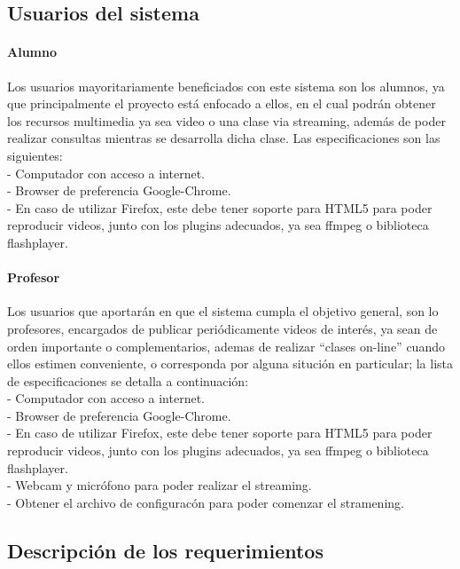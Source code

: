\documentclass[12pt]{article}
\begin{document}
\subsection{Usuarios del sistema}
\paragraph{Alumno\\}

Los usuarios mayoritariamente beneficiados con este sistema son los alumnos, ya que principalmente
el proyecto está enfocado a ellos, en el cual podrán obtener los recursos multimedia ya sea video
o una clase via streaming, además de poder realizar consultas mientras se desarrolla dicha clase. Las 
especificaciones son las siguientes:\\
- Computador con acceso a internet.\\
- Browser de preferencia Google-Chrome.\\
- En caso de utilizar Firefox, este debe tener soporte para
	HTML5 para poder reproducir videos, junto con los plugins adecuados, ya sea ffmpeg o biblioteca 
	flashplayer.\\

\paragraph{Profesor\\}

Los usuarios que aportarán en que el sistema cumpla el objetivo general, son lo profesores, 
encargados de publicar periódicamente videos de interés, ya sean de orden importante o complementarios, 
ademas de realizar ``clases on-line'' cuando ellos estimen conveniente, o corresponda por alguna situción
en particular; la lista de especificaciones se detalla a continuación:\\
- Computador con acceso a internet.\\
- Browser de preferencia Google-Chrome.\\
- En caso de utilizar Firefox, este debe tener soporte para
	HTML5 para poder reproducir videos, junto con los plugins adecuados, ya sea ffmpeg o biblioteca 
	flashplayer.\\
- Webcam y micrófono para poder realizar el streaming.\\
- Obtener el archivo de configuracón para poder comenzar el stramening.\\

\subsection{Descripción de los requerimientos}
\end{document}
